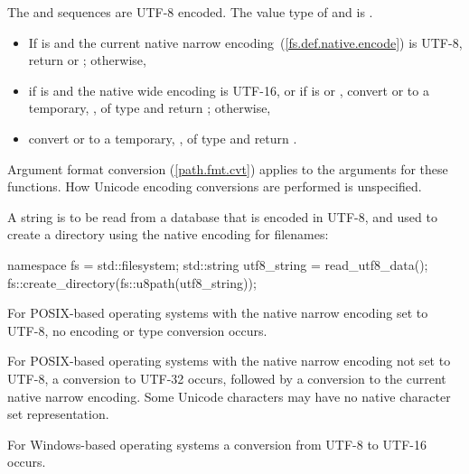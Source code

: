 \begin{itemdescr}
\pnum
\requires The  and 
  sequences are UTF-8 encoded. The value type of 
  and  is .

\pnum
\returns
\begin{itemize}
\item If  is  and the current native
      narrow encoding~(\ref{fs.def.native.encode}) is UTF-8,
      return  or ;
      otherwise,
\item if  is  and the
      native wide encoding is UTF-16, or
      if  is  or ,
      convert  or 
      to a temporary, , of type  and
      return ;
      otherwise,
\item convert  or 
      to a temporary, , of type  and
      return .
\end{itemize}

\pnum
\remarks Argument format conversion (\ref{path.fmt.cvt}) applies to the
  arguments for these functions. How Unicode encoding conversions are performed is
  unspecified.

\pnum
\begin{example}
A string is to be read from a database that is encoded in UTF-8, and used
    to create a directory using the native encoding for filenames:
\begin{codeblock}
namespace fs = std::filesystem;
std::string utf8_string = read_utf8_data();
fs::create_directory(fs::u8path(utf8_string));
\end{codeblock}

\pnum
For POSIX-based operating systems with the native narrow encoding set
    to UTF-8, no encoding or type conversion occurs.

\pnum
For POSIX-based operating systems with the native narrow encoding not
    set to UTF-8, a conversion to UTF-32 occurs, followed by a conversion to the
    current native narrow encoding. Some Unicode characters may have no native character
    set representation.

\pnum
For Windows-based operating systems a conversion from UTF-8 to
    UTF-16 occurs.
\end{example}
\end{itemdescr}


